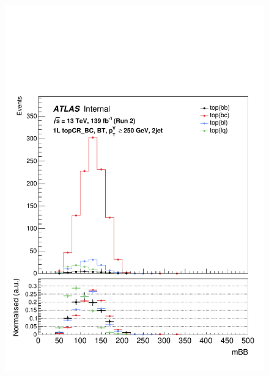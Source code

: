 \begin{figure}[h!]
\includegraphics[scale=0.253]{Images/VH/top/OneLepton_top_1bttag2jet_topCR_BC_250ptv_mBB.pdf}\\

\end{figure}

